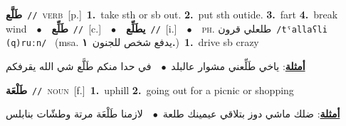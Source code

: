 \documentclass[10pt,a4paper,twoside]{article} %
\begin{document}
\begin{multicols}{2}
{\setlength\topsep{0pt}\textbf{\foreignlanguage{arabic}{طَلَّع}}\ {\color{gray}\texttt{//}\color{black}}\ \textsc{verb}\ [p.]\ \textbf{1.}~take sth or sb out.  \textbf{2.}~put sth outide.  \textbf{3.}~fart  \textbf{4.}~break wind\ \ $\bullet$\ \ \setlength\topsep{0pt}\textbf{\foreignlanguage{arabic}{طَلِّع}}\ {\color{gray}\texttt{//}\color{black}}\ [c.]\ \ $\bullet$\ \ \setlength\topsep{0pt}\textbf{\foreignlanguage{arabic}{يطَلِّع}}\ {\color{gray}\texttt{//}\color{black}}\ [i.]\ \ $\bullet$\ \ \textsc{ph.} \color{gray} \foreignlanguage{arabic}{طلعلي قرون}\color{black}\ {\color{gray}\texttt{/{\sffamily tˤallaʕli (q)ruːn}/}\color{black}}\ \color{gray} (msa. \foreignlanguage{arabic}{يدفع شخص للجنون}~\foreignlanguage{arabic}{\textbf{١.}})\color{black}\ \textbf{1.}~drive sb crazy\  \begin{flushright}\color{gray}\foreignlanguage{arabic}{\textbf{\underline{\foreignlanguage{arabic}{أمثلة}}}: ياخي طَلِّعني مشوار عالبلد\ $\bullet$\ \  في حدا منكم طَلَّع شي الله يقرفكم}\end{flushright}\color{black}} \vspace{2mm}

{\setlength\topsep{0pt}\textbf{\foreignlanguage{arabic}{طَلْعَة}}\ {\color{gray}\texttt{//}\color{black}}\ \textsc{noun}\ [f.]\ \textbf{1.}~uphill  \textbf{2.}~going out for a picnic or shopping\  \begin{flushright}\color{gray}\foreignlanguage{arabic}{\textbf{\underline{\foreignlanguage{arabic}{أمثلة}}}: ضلك ماشي دوز بتلاقي عيمينك طلعة\ $\bullet$\ \  لازمنا طَلْعَة مرتة وطشّات بنابلس}\end{flushright}\color{black}} \vspace{2mm}


\end{multicols}
\end{document}
